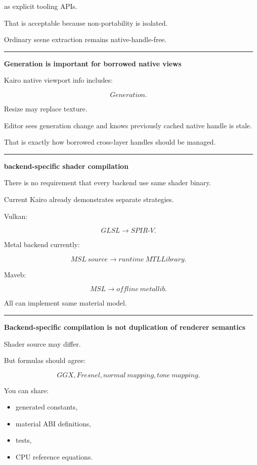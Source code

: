 as explicit tooling APIs.

That is acceptable because non-portability is isolated.

Ordinary scene extraction remains native-handle-free.

\begin{center}\rule{0.5\linewidth}{0.5pt}\end{center}

\textbf{Generation is important for borrowed native views}

Kairo native viewport info includes:

\[
Generation.
\]

Resize may replace texture.

Editor sees generation change and knows previously cached native handle is stale.

That is exactly how borrowed cross-layer handles should be managed.

\begin{center}\rule{0.5\linewidth}{0.5pt}\end{center}

\textbf{backend-specific shader compilation}

There is no requirement that every backend use same shader binary.

Current Kairo already demonstrates separate strategies.

Vulkan:

\[
GLSL
\rightarrow
SPIR\text{-}V.
\]

Metal backend currently:

\[
MSL\ source
\rightarrow
runtime\ MTLLibrary.
\]

Maveb:

\[
MSL
\rightarrow
offline\ metallib.
\]

All can implement same material model.

\begin{center}\rule{0.5\linewidth}{0.5pt}\end{center}

\textbf{Backend-specific compilation is not duplication of renderer semantics}

Shader source may differ.

But formulas should agree:

\[
GGX,
Fresnel,
normal\ mapping,
tone\ mapping.
\]

You can share:

\begin{itemize}
\tightlist
\item
  generated constants,
\item
  material ABI definitions,
\item
  tests,
\item
  CPU reference equations.
\end{itemize}

